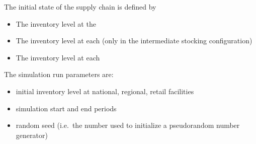 The initial state of the supply chain is defined by
\begin{itemize}
  \item The inventory level at the 
  \item The inventory level at each 
    (only in the intermediate stocking configuration)
  \item The inventory level at each 
\end{itemize}

The simulation run parameters are:
\begin{itemize}
  \item initial inventory level at national, regional, retail facilities
  \item simulation start and end periods
  \item random seed (i.e.\ the number used to initialize
    a pseudorandom number generator)
\end{itemize}




